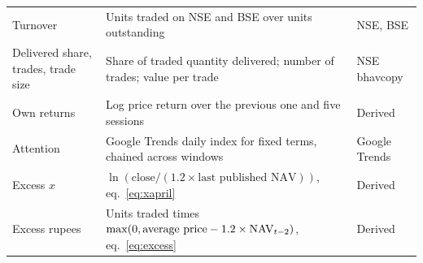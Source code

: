 \begin{table}[H]
\begin{tabularx}{\textwidth}{L{3.2cm}YL{3.4cm}}
Turnover & Units traded on NSE and BSE over units outstanding & NSE, BSE\\
Delivered share, trades, trade size & Share of traded quantity delivered; number of trades; value per trade & NSE bhavcopy\\
Own returns & Log price return over the previous one and five sessions & Derived\\
Attention & Google Trends daily index for fixed terms, chained across windows & Google Trends\\
Excess $x$ & $\ln(\text{close}/(1.2\times\text{last published NAV}))$, eq.~\eqref{eq:xapril} & Derived\\
Excess rupees & Units traded times $\max(0,\text{average price}-1.2\times\mathrm{NAV}_{t-2})$, eq.~\eqref{eq:excess} & Derived\\
\bottomrule
\end{tabularx}
\end{table}


